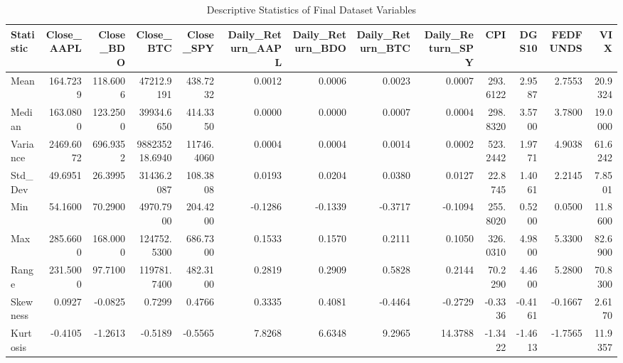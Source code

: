 \begin{table}[H]
\centering
\caption{Descriptive Statistics of Final Dataset Variables}
\label{tab:descriptive_stats}
\begin{safetable}
\begin{tabular}{lrrrrrrrrrrrr}
\toprule
Statistic & Close\_AAPL & Close\_BDO & Close\_BTC & Close\_SPY & Daily\_Return\_AAPL & Daily\_Return\_BDO & Daily\_Return\_BTC & Daily\_Return\_SPY & CPI & DGS10 & FEDFUNDS & VIX \\
\midrule
Mean & 164.7239 & 118.6006 & 47212.9191 & 438.7232 & 0.0012 & 0.0006 & 0.0023 & 0.0007 & 293.6122 & 2.9587 & 2.7553 & 20.9324 \\
Median & 163.0800 & 123.2500 & 39934.6650 & 414.3350 & 0.0000 & 0.0000 & 0.0007 & 0.0004 & 298.8320 & 3.5700 & 3.7800 & 19.0000 \\
Variance & 2469.6072 & 696.9352 & 988235218.6940 & 11746.4060 & 0.0004 & 0.0004 & 0.0014 & 0.0002 & 523.2442 & 1.9771 & 4.9038 & 61.6242 \\
Std\_Dev & 49.6951 & 26.3995 & 31436.2087 & 108.3808 & 0.0193 & 0.0204 & 0.0380 & 0.0127 & 22.8745 & 1.4061 & 2.2145 & 7.8501 \\
Min & 54.1600 & 70.2900 & 4970.7900 & 204.4200 & -0.1286 & -0.1339 & -0.3717 & -0.1094 & 255.8020 & 0.5200 & 0.0500 & 11.8600 \\
Max & 285.6600 & 168.0000 & 124752.5300 & 686.7300 & 0.1533 & 0.1570 & 0.2111 & 0.1050 & 326.0310 & 4.9800 & 5.3300 & 82.6900 \\
Range & 231.5000 & 97.7100 & 119781.7400 & 482.3100 & 0.2819 & 0.2909 & 0.5828 & 0.2144 & 70.2290 & 4.4600 & 5.2800 & 70.8300 \\
Skewness & 0.0927 & -0.0825 & 0.7299 & 0.4766 & 0.3335 & 0.4081 & -0.4464 & -0.2729 & -0.3336 & -0.4161 & -0.1667 & 2.6170 \\
Kurtosis & -0.4105 & -1.2613 & -0.5189 & -0.5565 & 7.8268 & 6.6348 & 9.2965 & 14.3788 & -1.3422 & -1.4613 & -1.7565 & 11.9357 \\
\bottomrule
\end{tabular}
\end{safetable}
\end{table}

